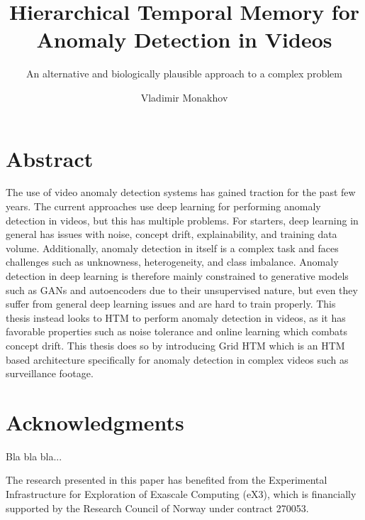 \documentclass[USenglish]{ifimaster}  %
\title{Hierarchical Temporal Memory for Anomaly Detection in Videos}
\subtitle{An alternative and biologically plausible approach to a complex problem }         %
\author{Vladimir Monakhov}                      %
\begin{document}
\duoforside[
  dept={Department of Informatics},   %
  program={Informatics: Robotics and Intelligent Systems},         %
  long
]                                        %

\frontmatter{}
\mainmatter{}

\chapter*{Abstract} 
The use of video anomaly detection systems has gained traction for the past few years. The current approaches use deep learning for performing anomaly detection in videos, but this has multiple problems. For starters, deep learning in general has issues with noise, concept drift, explainability, and training data volume. Additionally, anomaly detection in itself is a complex task and faces challenges such as unknowness, heterogeneity, and class imbalance. Anomaly detection in deep learning is therefore mainly constrained to generative models such as GANs and autoencoders due to their unsupervised nature, but even they suffer from general deep learning issues and are hard to train properly. This thesis instead looks to HTM to perform anomaly detection in videos, as it has favorable properties such as noise tolerance and online learning which combats concept drift. This thesis does so by introducing Grid HTM which is an HTM based architecture specifically for anomaly detection in complex videos such as surveillance footage.
\chapter*{Acknowledgments} 
Bla bla bla...
\par
The research presented in this paper has benefited from the Experimental Infrastructure for Exploration of Exascale Computing (eX3), which is financially supported by the Research Council of Norway under contract 270053.

\tableofcontents
\listoffigures
\listoftables

\mainmatter






\backmatter{}
\printbibliography
\end{document}
